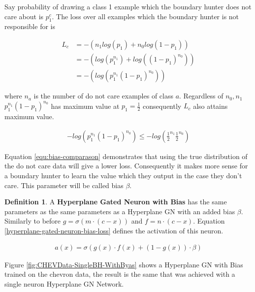 \documentclass[notitlepage]{report}
\theoremstyle{definition}
\newtheorem{definition}{Definition}[section]
\begin{document}
Say probability of drawing a class 1 example which the boundary hunter does not care about is $p^c_1$. The loss over all examples which the boundary hunter is not responsible for is

\begin{align*}
	L_c &= -(n_1log(p_1) + n_0log(1-p_1))\\
	&= -(log(p_1^{n_1}) + log((1-p_1)^{n_0}))\\
	&= -(log(p_1^{n_1}(1-p_1)^{n_0}))
\end{align*}

where $n_a$ is the number of do not care examples of class $a$. Regardless of $n_0, n_1$ $p_1^{n_1}(1-p_1)^{n_0}$ has maximum value at $p_1 = \frac{1}{2}$ consequently $L_c$ also attains maximum value.

\begin{align}
	-log(p_1^{n_1}(1-p_1)^{n_0}) \leq -log(\frac{1}{2}^{n_1}\frac{1}{2}^{n_0})
	\label{equ:bias-comparason}
\end{align} 

Equation \ref{equ:bias-comparason} demonstrates that using the true distribution of the do not care data will give a lower loss. Consequently it makes more sense for a boundary hunter to learn the value which they output in the case they don't care. This parameter will be called bias $\beta$. 

\theoremstyle{definition}
\begin{definition}
	A \textbf{Hyperplane Gated Neuron with Bias} has the same parameters as the same parameters as a Hyperplane GN with an added bias $\beta$. Similarly to before $g = \sigma(m \cdot (c - x))$ and $f = n \cdot (c - x)$. Equation \ref{hyperplane-gated-neuron-bias-loss} defines the activation of this neuron.
	
	\begin{align}
	a(x) = \sigma(g(x) \cdot f(x) + (1 - g(x)) \cdot \beta)
	\label{hyperplane-gated-neuron-bias-loss}
	\end{align}
\end{definition}

Figure \ref{fig:CHEVData-SingleBH-WithByas} shows a Hyperplane GN with Bias trained on the chevron data, the result is the same that was achieved with a single neuron Hyperplane GN Network. 
\end{document}
